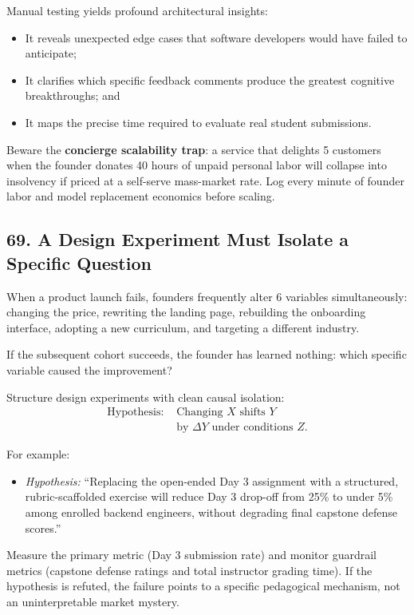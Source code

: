 Manual testing yields profound architectural insights:
\begin{itemize}
    \item It reveals unexpected edge cases that software developers would have failed to anticipate;
    \item It clarifies which specific feedback comments produce the greatest cognitive breakthroughs; and
    \item It maps the precise time required to evaluate real student submissions.
\end{itemize}

Beware the \textbf{concierge scalability trap}: a service that delights 5 customers when the founder donates 40 hours of unpaid personal labor will collapse into insolvency if priced at a self-serve mass-market rate. Log every minute of founder labor and model replacement economics before scaling.

\subsection*{69. A Design Experiment Must Isolate a Specific Question}

When a product launch fails, founders frequently alter 6 variables simultaneously: changing the price, rewriting the landing page, rebuilding the onboarding interface, adopting a new curriculum, and targeting a different industry.

If the subsequent cohort succeeds, the founder has learned nothing: which specific variable caused the improvement?

Structure design experiments with clean causal isolation:
\begin{equation}
\begin{aligned}
\text{Hypothesis: } &\text{Changing } X \text{ shifts } Y \\
&\text{by } \Delta Y \text{ under conditions } Z.
\end{aligned}
\end{equation}

For example:
\begin{itemize}
    \item \emph{Hypothesis:} ``Replacing the open-ended Day 3 assignment with a structured, rubric-scaffolded exercise will reduce Day 3 drop-off from 25\% to under 5\% among enrolled backend engineers, without degrading final capstone defense scores.''
\end{itemize}

Measure the primary metric (Day 3 submission rate) and monitor guardrail metrics (capstone defense ratings and total instructor grading time). If the hypothesis is refuted, the failure points to a specific pedagogical mechanism, not an uninterpretable market mystery.

